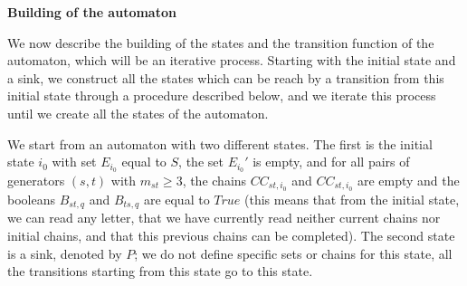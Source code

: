 \documentclass[reqno,12pt]{amsart}
\theoremstyle{definition}
\begin{document}
\medskip

{\bf Building of the automaton}

We now describe the building of the states  and the transition function of the automaton, which will be an iterative process. Starting with the initial state and a sink, we construct all the states which can be reach by a transition from this initial state through a procedure described below, and we iterate this process until we create all the states of the automaton. 
 
We start from an automaton with two different states. The first is the initial state $i_0$  with set $E_{i_0}$ equal to $S$, the set $E_{i_0}'$ is empty, and for all pairs of generators $(s,t)$ with $m_{st}\geq 3$, the chains $CC_{st,i_0}$ and $CC_{st,i_0}$ are empty and the booleans $B_{st,q}$ and $B_{ts,q}$ are equal to $True$ (this means that from the initial state, we can read  any letter, that we have currently read neither current chains nor initial chains, and that this previous chains can be completed). The second state is a sink, denoted by $P$; we do not define specific sets or chains for this state, all the transitions starting from this state go to this state.
 
\end{document}
